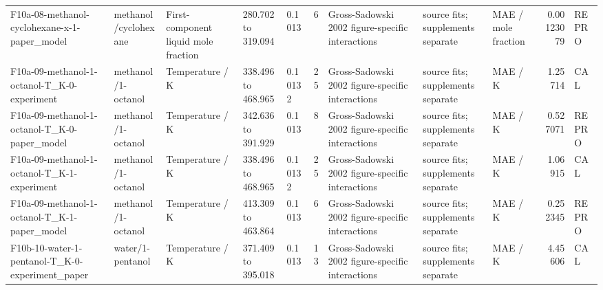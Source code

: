 \begin{landscape}
\begin{longtable}{L{1.9cm}L{2.5cm}L{2.1cm}L{1.6cm}L{1.6cm}rL{2.4cm}L{1.9cm}L{2.2cm}rL{1cm}}
F10a-\allowbreak{}08-\allowbreak{}methanol-\allowbreak{}cyclohexane-\allowbreak{}x-\allowbreak{}1-\allowbreak{}paper\_\allowbreak{}model & methanol/\allowbreak{}cyclohexane & First-\allowbreak{}component liquid mole fraction & 280.702 to 319.094 & 0.1013 & 6 & Gross-\allowbreak{}Sadowski 2002 figure-\allowbreak{}specific interactions & source fits; supplements separate & MAE /\allowbreak{} mole fraction & 0.00123079 & REPRO \\
F10a-\allowbreak{}09-\allowbreak{}methanol-\allowbreak{}1-\allowbreak{}octanol-\allowbreak{}T\_\allowbreak{}K-\allowbreak{}0-\allowbreak{}experiment & methanol/\allowbreak{}1-\allowbreak{}octanol & Temperature /\allowbreak{} K & 338.496 to 468.965 & 0.10132 & 25 & Gross-\allowbreak{}Sadowski 2002 figure-\allowbreak{}specific interactions & source fits; supplements separate & MAE /\allowbreak{} K & 1.25714 & CAL \\
F10a-\allowbreak{}09-\allowbreak{}methanol-\allowbreak{}1-\allowbreak{}octanol-\allowbreak{}T\_\allowbreak{}K-\allowbreak{}0-\allowbreak{}paper\_\allowbreak{}model & methanol/\allowbreak{}1-\allowbreak{}octanol & Temperature /\allowbreak{} K & 342.636 to 391.929 & 0.1013 & 8 & Gross-\allowbreak{}Sadowski 2002 figure-\allowbreak{}specific interactions & source fits; supplements separate & MAE /\allowbreak{} K & 0.527071 & REPRO \\
F10a-\allowbreak{}09-\allowbreak{}methanol-\allowbreak{}1-\allowbreak{}octanol-\allowbreak{}T\_\allowbreak{}K-\allowbreak{}1-\allowbreak{}experiment & methanol/\allowbreak{}1-\allowbreak{}octanol & Temperature /\allowbreak{} K & 338.496 to 468.965 & 0.10132 & 25 & Gross-\allowbreak{}Sadowski 2002 figure-\allowbreak{}specific interactions & source fits; supplements separate & MAE /\allowbreak{} K & 1.06915 & CAL \\
F10a-\allowbreak{}09-\allowbreak{}methanol-\allowbreak{}1-\allowbreak{}octanol-\allowbreak{}T\_\allowbreak{}K-\allowbreak{}1-\allowbreak{}paper\_\allowbreak{}model & methanol/\allowbreak{}1-\allowbreak{}octanol & Temperature /\allowbreak{} K & 413.309 to 463.864 & 0.1013 & 6 & Gross-\allowbreak{}Sadowski 2002 figure-\allowbreak{}specific interactions & source fits; supplements separate & MAE /\allowbreak{} K & 0.252345 & REPRO \\
F10b-\allowbreak{}10-\allowbreak{}water-\allowbreak{}1-\allowbreak{}pentanol-\allowbreak{}T\_\allowbreak{}K-\allowbreak{}0-\allowbreak{}experiment\_\allowbreak{}paper & water/\allowbreak{}1-\allowbreak{}pentanol & Temperature /\allowbreak{} K & 371.409 to 395.018 & 0.1013 & 13 & Gross-\allowbreak{}Sadowski 2002 figure-\allowbreak{}specific interactions & source fits; supplements separate & MAE /\allowbreak{} K & 4.45606 & CAL \\

\end{longtable}
\end{landscape}
